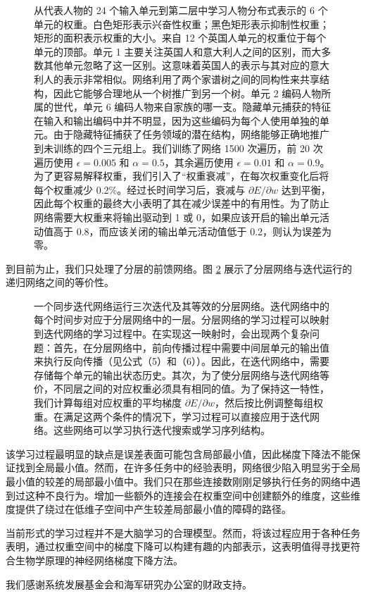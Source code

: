 \documentclass[lang=cn,a4paper,newtx]{elegantpaper}
\begin{document}
\begin{figure}
  \centering
  \begingroup
  \endgroup
  \caption{从代表人物的 24 个输入单元到第二层中学习人物分布式表示的 6 个单元的权重。白色矩形表示兴奋性权重；黑色矩形表示抑制性权重；矩形的面积表示权重的大小。来自 12 个英国人单元的权重位于每个单元的顶部。单元 1 主要关注英国人和意大利人之间的区别，而大多数其他单元忽略了这一区别。这意味着英国人的表示与其对应的意大利人的表示非常相似。网络利用了两个家谱树之间的同构性来共享结构，因此它能够合理地从一个树推广到另一个树。单元 2 编码人物所属的世代，单元 6 编码人物来自家族的哪一支。隐藏单元捕获的特征在输入和输出编码中并不明显，因为这些编码为每个人使用单独的单元。由于隐藏特征捕获了任务领域的潜在结构，网络能够正确地推广到未训练的四个三元组上。我们训练了网络 1500 次遍历，前 20 次遍历使用 \(\epsilon = 0.005\) 和 \(\alpha =0.5\)，其余遍历使用 \(\epsilon = 0.01\) 和 \(\alpha =0.9\)。为了更容易解释权重，我们引入了“权重衰减”，在每次权重变化后将每个权重减少 0.2\%。经过长时间学习后，衰减与 \(\partial E / \partial w\) 达到平衡，因此每个权重的最终大小表明了其在减少误差中的有用性。为了防止网络需要大权重来将输出驱动到 1 或 0，如果应该开启的输出单元活动值高于 0.8，而应该关闭的输出单元活动值低于 0.2，则认为误差为零。}
  \label{fig-4}
\end{figure}

到目前为止，我们只处理了分层的前馈网络。图 \ref{fig-5} 展示了分层网络与迭代运行的递归网络之间的等价性。

\begin{figure}
  \begingroup
  \endgroup
  \centering
  \caption{一个同步迭代网络运行三次迭代及其等效的分层网络。迭代网络中的每个时间步对应于分层网络中的一层。分层网络的学习过程可以映射到迭代网络的学习过程中。在实现这一映射时，会出现两个复杂问题：首先，在分层网络中，前向传播过程中需要中间层单元的输出值来执行反向传播（见公式（5）和（6））。因此，在迭代网络中，需要存储每个单元的输出状态历史。其次，为了使分层网络与迭代网络等价，不同层之间的对应权重必须具有相同的值。为了保持这一特性，我们计算每组对应权重的平均梯度 \(\partial E / \partial w\)，然后按比例调整每组权重。在满足这两个条件的情况下，学习过程可以直接应用于迭代网络。这些网络可以学习执行迭代搜索或学习序列结构。}
  \label{fig-5}
\end{figure}

该学习过程最明显的缺点是误差表面可能包含局部最小值，因此梯度下降法不能保证找到全局最小值。然而，在许多任务中的经验表明，网络很少陷入明显劣于全局最小值的较差的局部最小值中。我们只在那些连接数刚刚足够执行任务的网络中遇到过这种不良行为。增加一些额外的连接会在权重空间中创建额外的维度，这些维度提供了绕过在低维子空间中产生较差局部最小值的障碍的路径。

当前形式的学习过程并不是大脑学习的合理模型。然而，将该过程应用于各种任务表明，通过权重空间中的梯度下降可以构建有趣的内部表示，这表明值得寻找更符合生物学原理的神经网络梯度下降方法。

我们感谢系统发展基金会和海军研究办公室的财政支持。
\end{document}
